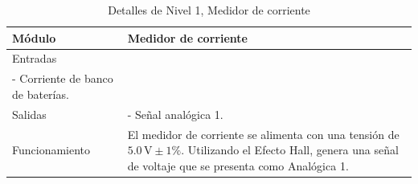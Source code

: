 
\begin{table}[h!]
    \centering
    \caption{Detalles de Nivel 1, Medidor de corriente}
    \label{tab:nivel2_Voltaje}
    \begin{tabular}{ll}
    \toprule
        Módulo  & Medidor de corriente\\ 
    \midrule
        Entradas & 
        \begin{minipage}[t]{0.75\linewidth}
  - Alimentación $5.0 \, \text{V} \pm 1\%$\\
   - Corriente de banco de baterías.
 
        \end{minipage} \\
    \midrule
        Salidas & 
        \begin{minipage}[t]{0.75\linewidth}
    - Señal analógica 1.

        \end{minipage} \\
    \midrule
        Funcionamiento & 
        \begin{minipage}[t]{0.75\linewidth}
El medidor de corriente se alimenta con una tensión de $5.0 \, \text{V} \pm 1\%$. Utilizando el Efecto Hall, genera una señal de voltaje que se presenta como Analógica 1.


        \end{minipage} \\
    \bottomrule
    \end{tabular}
\end{table}